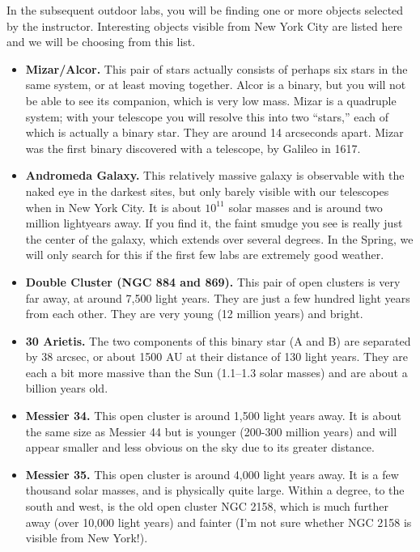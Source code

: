 
\noindent In the subsequent outdoor labs, you will be finding one or
more objects selected by the instructor. Interesting objects visible
from New York City are listed here and we will be choosing from this
list.

\begin{itemize}  
\item {\bf Mizar/Alcor.} This pair of stars actually  consists of
perhaps six stars in the same system, or at least moving
together. Alcor is a binary, but you will not be able to see its
companion, which is very low mass. Mizar is a quadruple system; with
your telescope you will resolve this into two ``stars,'' each of which
is actually a binary star. They are around 14 arcseconds apart. Mizar
was the first binary discovered with a telescope, by Galileo in 1617.
\item {\bf Andromeda Galaxy.} This relatively massive galaxy is observable
with the naked eye in the darkest sites, but only barely visible with
  our telescopes when in New York City. It is about $10^{11}$ solar
  masses and is around two million lightyears away. If you find it,
  the faint smudge you see is really just the center of the galaxy,
  which extends over several degrees. In the Spring, we will only
  search for this if the first few labs are extremely good weather.
\item {\bf Double Cluster (NGC 884 and 869).} This pair of open
  clusters is very far away, at around 7,500 light years. They are
  just a few hundred light years from each other. They are very young
  (12 million years) and bright.
\item {\bf 30 Arietis.} The two components of this binary star (A and
  B) are separated by 38 arcsec, or about 1500 AU at their distance of
  130 light years.  They are each a bit more massive than the Sun
  (1.1--1.3 solar masses) and are about a billion years old.
\item {\bf Messier 34.} This open cluster is around 1,500 light years
  away. It is about the same size as Messier 44 but is younger
  (200-300 million years) and will appear smaller and less obvious on
  the sky due to its greater distance. 
\item {\bf Messier 35.} This open cluster is around 4,000 light years
  away. It is a few thousand solar masses, and is physically
  quite large. Within a degree, to the south and west, is the old open
  cluster NGC 2158, which is much further away (over 10,000 light
  years) and fainter (I'm not sure whether NGC 2158 is visible from
  New York!). 

\end{itemize}
